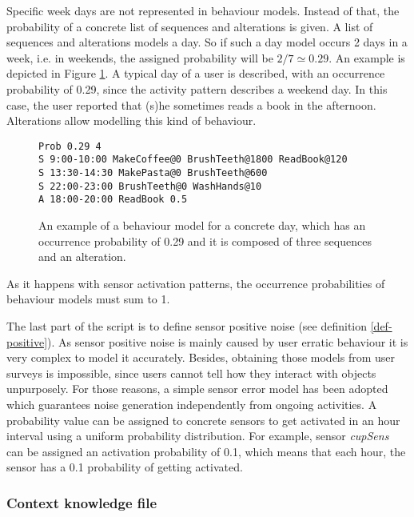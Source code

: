 Specific week days are not represented in behaviour models. Instead of that, the probability of a concrete list of sequences and alterations is given. A list of sequences and alterations models a day. So if such a day model occurs 2 days in a week, i.e. in weekends, the assigned probability will be $2/7 \simeq 0.29$. An example is depicted in Figure \ref{fig:activity-pattern}. A typical day of a user is described, with an occurrence probability of 0.29, since the activity pattern describes a weekend day. In this case, the user reported that (s)he sometimes reads a book in the afternoon. Alterations allow modelling this kind of behaviour.


\begin{figure}
\begin{small}
\lstset{linewidth=\textwidth}
\begin{lstlisting}
Prob 0.29 4
S 9:00-10:00 MakeCoffee@0 BrushTeeth@1800 ReadBook@120
S 13:30-14:30 MakePasta@0 BrushTeeth@600
S 22:00-23:00 BrushTeeth@0 WashHands@10
A 18:00-20:00 ReadBook 0.5
\end{lstlisting}
\end{small}
\caption{An example of a behaviour model for a concrete day, which has an occurrence probability of 0.29 and it is composed of three sequences and an alteration.}
\label{fig:activity-pattern}
\end{figure}

As it happens with sensor activation patterns, the occurrence probabilities of behaviour models must sum to 1.

The last part of the script is to define sensor positive noise (see definition \ref{def-positive}). As sensor positive noise is mainly caused by user erratic behaviour it is very complex to model it accurately. Besides, obtaining those models from user surveys is impossible, since users cannot tell how they interact with objects unpurposely. For those reasons, a simple sensor error model has been adopted which guarantees noise generation independently from ongoing activities. A probability value can be assigned to concrete sensors to get activated in an hour interval using a uniform probability distribution. For example, sensor \textit{cupSens} can be assigned an activation probability of 0.1, which means that each hour, the sensor has a 0.1 probability of getting activated. 

\subsubsection*{Context knowledge file}

